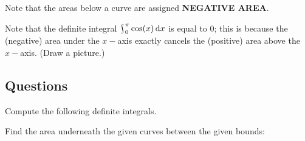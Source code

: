 Note that the areas below a curve are assigned \textbf{\textcolor{RubineRed}{NEGATIVE AREA}}.

\begin{ex}
  Note that the definite integral $ \rint^\pi_0 \cos(x) \dif{x} $ is equal to 0; this is because the (negative) area under the $ x-$axis exactly
  cancels the (positive) area above the $ x-$axis. (Draw a picture.)
\end{ex}

\subsection*{Questions}
\begin{questions}
  \questioA Compute the following definite integrals.
  \questioA Find the area underneath the given curves between the given bounds:
\end{questions}
